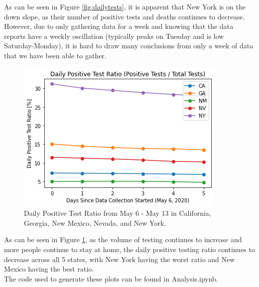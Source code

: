 \documentclass[11pt]{article}
\begin{document}
\noindent
As can be seen in Figure \ref{fig:dailytests}, it is apparent that New York is on the down slope, as their number of positive tests and deaths continues to decrease. However, due to only gathering data for a week and knowing that the data reports have a weekly oscillation (typically peaks on Tuesday and is low Saturday-Monday), it is hard to draw many conclusions from only a week of data that we have been able to gather.

\pagebreak

\FloatBarrier
\begin{figure}[h]
    \centering
    \includegraphics[width=\linewidth]{diagrams/analysis/percent_positive.png}
    \caption{Daily Positive Test Ratio from May 6 - May 13 in California, Georgia, New Mexico, Nevada, and New York.}
    \label{fig:percentpositive}
\end{figure}
\FloatBarrier

\noindent
As can be seen in Figure \ref{fig:percentpositive}, as the volume of testing continues to increase and more people continue to stay at home, the daily positive testing ratio continues to decrease across all 5 states, with New York having the worst ratio and New Mexico having the best ratio. \\

\noindent
The code used to generate these plots can be found in Analysis.ipynb.

\end{document}

